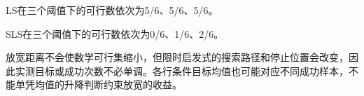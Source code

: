 LS在三个阈值下的可行数依次为5/6、5/6、5/6。

SLS在三个阈值下的可行数依次为0/6、1/6、2/6。

放宽距离不会使数学可行集缩小，但限时启发式的搜索路径和停止位置会改变，因此实测目标或成功次数不必单调。各行条件目标均值也可能对应不同成功样本，不能单凭均值的升降判断约束放宽的收益。
